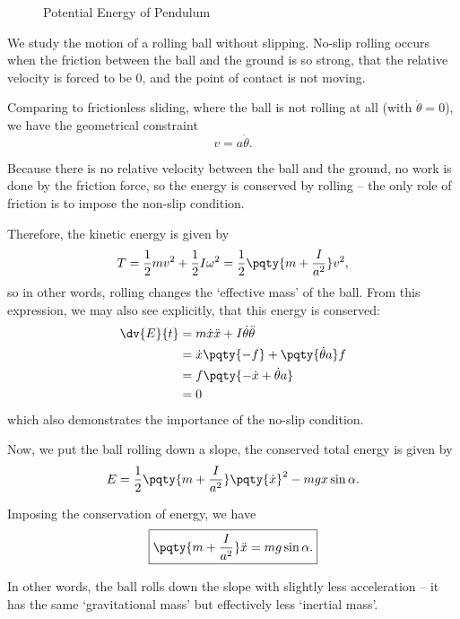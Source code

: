 \begin{figure}[ht!]
    \centering

    \caption{Potential Energy of Pendulum}
    \label{fig:potential-energy-pendulum}%
\end{figure}

\begin{example}
    \label{ex:sliding-rolling-ball}%
    We study the motion of a rolling ball without slipping. No-slip rolling occurs when the friction between the ball and the ground is so strong, that the relative velocity is forced to be \(0\), and the point of contact is not moving.

    Comparing to frictionless sliding, where the ball is not rolling at all (with \(\dot{\theta} = 0\)), we have the geometrical constraint
    \begin{equation}
        \boxed{v = a \dot{\theta}.}
    \end{equation}

    Because there is no relative velocity between the ball and the ground, no work is done by the friction force, so the energy is conserved by rolling -- the only role of friction is to impose the non-slip condition.

    Therefore, the kinetic energy is given by
    \begin{equation}
        T = \frac{1}{2} m v^2 + \frac{1}{2} I \omega^2 = \frac{1}{2} \pqty{m + \frac{I}{a^2}} v^2,
    \end{equation}
    so in other words, rolling changes the `effective mass' of the ball. From this expression, we may also see explicitly, that this energy is conserved:
    \begin{subequations}\begin{align}
        \dv{E}{t} &= m \dot{x} \ddot{x} + I \dot{\theta} \ddot{\theta} \\
        &= \dot{x} \pqty{-f} + \pqty{\dot{\theta} a} f \\
        &= f\pqty{- \dot{x} + \dot{\theta} a} \\
        &= 0
    \end{align}\end{subequations}
    which also demonstrates the importance of the no-slip condition.

    Now, we put the ball rolling down a slope, the conserved total energy is given by
    \begin{equation}
        E = \frac{1}{2} \pqty{m + \frac{I}{a^2}} \pqty{\dot{x}}^2 - mg x \sin \alpha.
    \end{equation}

    Imposing the conservation of energy, we have
    \begin{equation}
        \boxed{\pqty{m + \frac{I}{a^2}} \ddot{x} = mg \sin \alpha.}
    \end{equation}

    In other words, the ball rolls down the slope with slightly less acceleration -- it has the same `gravitational mass' but effectively less `inertial mass'.
\end{example}


